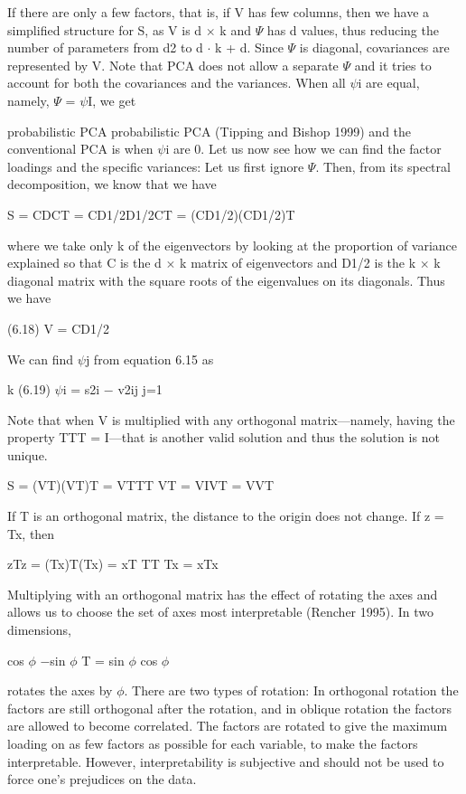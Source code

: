 If there are only a few factors, that is, if V has few columns, then we have a simplified structure for S, as V is d $\times$ k and $\Psi$ has d values, thus reducing the number of parameters from d2 to d $\cdot$ k + d. Since $\Psi$ is diagonal, covariances are represented by V. Note that PCA does not allow a separate $\Psi$ and it tries to account for both the covariances and the variances. When all $\psi$i are equal, namely, $\Psi$ = $\psi$I, we get

probabilistic PCA probabilistic PCA (Tipping and Bishop 1999) and the conventional PCA is when $\psi$i are 0. Let us now see how we can find the factor loadings and the specific variances: Let us first ignore $\Psi$. Then, from its spectral decomposition, we know that we have

S = CDCT = CD1/2D1/2CT = (CD1/2)(CD1/2)T

where we take only k of the eigenvectors by looking at the proportion of variance explained so that C is the d $\times$ k matrix of eigenvectors and D1/2 is the k $\times$ k diagonal matrix with the square roots of the eigenvalues on its diagonals. Thus we have

(6.18) V = CD1/2

We can find $\psi$j from equation 6.15 as

k (6.19) $\psi$i = s2i $-$ v2ij j=1

Note that when V is multiplied with any orthogonal matrix---namely, having the property TTT = I---that is another valid solution and thus the solution is not unique.

S = (VT)(VT)T = VTTT VT = VIVT = VVT

If T is an orthogonal matrix, the distance to the origin does not change. If z = Tx, then

zTz = (Tx)T(Tx) = xT TT Tx = xTx

Multiplying with an orthogonal matrix has the effect of rotating the axes and allows us to choose the set of axes most interpretable (Rencher 1995). In two dimensions,

cos $\phi$ $-$sin $\phi$ T = sin $\phi$ cos $\phi$

rotates the axes by $\phi$. There are two types of rotation: In orthogonal rotation the factors are still orthogonal after the rotation, and in oblique rotation the factors are allowed to become correlated. The factors are rotated to give the maximum loading on as few factors as possible for each variable, to make the factors interpretable. However, interpretability is subjective and should not be used to force one’s prejudices on the data.

